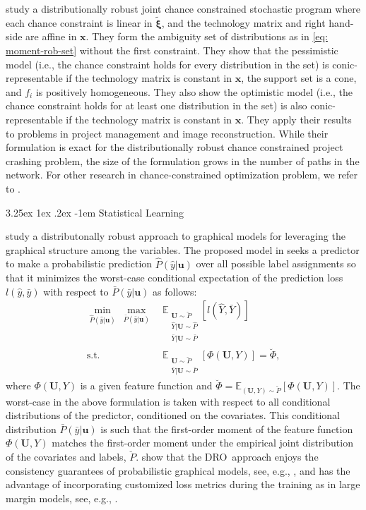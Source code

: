 \documentclass[final,onefignum,onetabnum]{class}
\makeatletter
\renewcommand\paragraph{\@startsection{paragraph}{4}{\z@}%
  {3.25ex \@plus1ex \@minus.2ex}%
  {-1em}%
  {\normalfont\normalsize\bfseries}}
\newcommand{\ee}[2]{\mathbb{E}_{#1} \left[ #2 \right]}
\newcommand{\bs}[1]{\boldsymbol{#1}} %
\newcommand{\txi}{\tilde{\bs{\xi}}}
\newcommand{\dro}{DRO}
\newcommand{\st}{\text{s.t.}}
\makeatother
\begin{document}
\citet{hanasusanto2017ambiguous} study a distributionally robust joint chance constrained stochastic program  where each chance constraint is linear in $\txi$, and the technology matrix and right hand-side are affine in $\bs{x}$. They form the ambiguity set of distributions as in \eqref{eq: moment-rob-set} without the first constraint. They show that the pessimistic model (i.e., the chance constraint holds for every distribution in the set) is conic-representable if the technology matrix is constant in $\bs{x}$, the support set is a cone, and $f_{i}$ is positively homogeneous. They also show the optimistic model (i.e., the chance constraint holds for at least one distribution in the set) is also conic-representable if the technology matrix is constant in $\bs{x}$. 
They apply  their results to problems in project management and image reconstruction. 
While their formulation is exact for the distributionally
robust chance constrained project crashing problem, the size of the formulation grows in the number of paths in the network. 
For other research in chance-constrained optimization problem, we refer to \citet{xie2017optimized,xie2018joint}. 



\paragraph{Statistical Learning}

\citet{fathony2018} study a distributonally robust approach to graphical models for leveraging the graphical structure among the  variables. 
The proposed model in \citet{fathony2018} seeks a predictor to make a probabilistic prediction $\hat{P}(\hat{y}|\bs{u})$ over all possible label assignments so that it minimizes the worst-case conditional expectation of the prediction loss $l(\hat{y},\bar{y})$ with respect to $\bar{P}(\bar{y}|\bs{u})$ as follows:
\begin{align*}
	\min_{\hat{P}(\hat{y}|\bs{u})} \ \max_{\bar{P}(\bar{y}|\bs{u})} \ & \ee{\substack{\bs{U} \sim \breve{P} \\ \hat{Y}|
			\bs{U} \sim \hat{P}\\ \bar{Y}|
			\bs{U} \sim \bar{P}}}{l(\hat{Y},\bar{Y})} \\
	\st \quad & \ee{\substack{\bs{U} \sim \breve{P} \\ \bar{Y}|
			\bs{U} \sim \bar{P}}}{\Phi(\bs{U},Y)}   =\breve{\Phi}, 
\end{align*}
where $\Phi(\bs{U}, Y)$ is a given feature function and $\breve{\Phi}=\ee{(\bs{U},Y) \sim \breve{P}}{\Phi(\bs{U},Y)}$.  The  worst-case in the above formulation is taken with respect to all conditional distributions of the predictor, conditioned on the covariates. This conditional distribution $\bar{P}(\bar{y}|\bs{u})$ is such that the first-order moment of the  feature function $\Phi(\bs{U}, Y)$ matches the first-order moment under the empirical  joint distribution of the covariates and labels, $\breve{P}$. 
\citet{fathony2018} show that the \dro\  approach enjoys the consistency guarantees of probabilistic graphical models, see, e.g., \citet{lafferty2001}, and has the advantage of  incorporating
customized loss metrics during the training as in large margin models, see, e.g., \citet{tsochantaridis2005}. 
\end{document}
